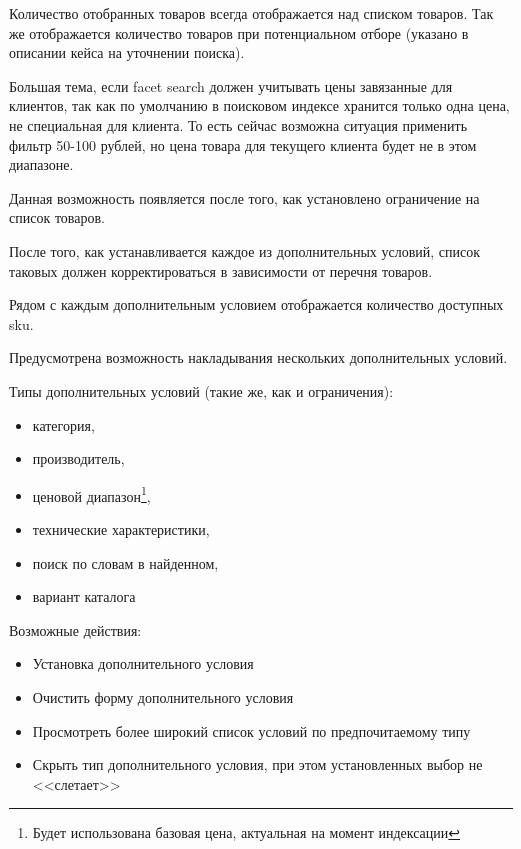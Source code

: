 {


\begin{wiki}
Количество отобранных товаров всегда отображается над списком товаров.
Так же отображается количество товаров при потенциальном отборе (указано в описании кейса на уточнении поиска).
\end{wiki}

\begin{hybris}
Большая тема, если facet search должен учитывать цены завязанные для клиентов, так как по умолчанию в поисковом индексе хранится только одна цена, не специальная для клиента. То есть сейчас возможна ситуация применить фильтр 50-100 рублей, но цена товара для текущего клиента будет не в этом диапазоне.
\end{hybris}


\begin{itogolong}
Данная возможность появляется после того, как установлено ограничение на список товаров.

После того, как устанавливается каждое из дополнительных условий, список таковых должен корректироваться в зависимости от перечня товаров.

Рядом с каждым дополнительным условием отображается количество доступных sku.

Предусмотрена возможность накладывания нескольких дополнительных условий.

Типы дополнительных условий (такие же, как и ограничения):

\begin{itemize}
\item категория, 
\item производитель, 
\item ценовой диапазон\footnote{Будет использована базовая цена, актуальная на момент индексации}, 
\item технические характеристики, 
\item поиск по словам в найденном, 
\item вариант каталога
\end{itemize}

Возможные действия:

\begin{itemize}
\item Установка дополнительного условия
\item Очистить форму дополнительного условия
\item Просмотреть более широкий список условий по предпочитаемому типу
\item Скрыть тип дополнительного условия, при этом установленных выбор не <<слетает>>
\end{itemize}
\end{itogolong}


}



